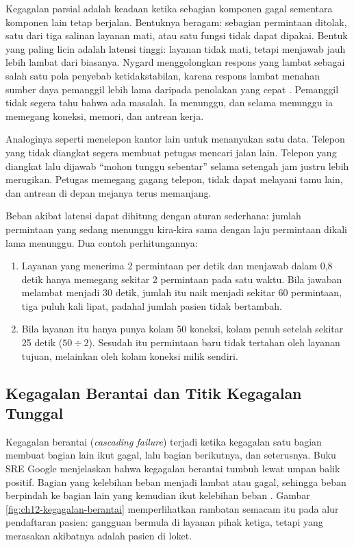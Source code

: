 Kegagalan parsial adalah keadaan ketika sebagian komponen gagal sementara komponen lain tetap
berjalan. Bentuknya beragam: sebagian permintaan ditolak, satu dari tiga salinan layanan mati, atau
satu fungsi tidak dapat dipakai. Bentuk yang paling licin adalah latensi tinggi: layanan tidak mati,
tetapi menjawab jauh lebih lambat dari biasanya. Nygard menggolongkan respons yang lambat sebagai
salah satu pola penyebab ketidakstabilan, karena respons lambat menahan sumber daya pemanggil lebih
lama daripada penolakan yang cepat \cite{c12-nygard2018}. Pemanggil tidak segera tahu bahwa ada
masalah. Ia menunggu, dan selama menunggu ia memegang koneksi, memori, dan antrean kerja.

Analoginya seperti menelepon kantor lain untuk menanyakan satu data. Telepon yang tidak diangkat
segera membuat petugas mencari jalan lain. Telepon yang diangkat lalu dijawab ``mohon tunggu
sebentar'' selama setengah jam justru lebih merugikan. Petugas memegang gagang telepon, tidak dapat
melayani tamu lain, dan antrean di depan mejanya terus memanjang.

Beban akibat latensi dapat dihitung dengan aturan sederhana: jumlah permintaan yang sedang menunggu
kira-kira sama dengan laju permintaan dikali lama menunggu. Dua contoh perhitungannya:
\begin{enumerate}
  \item Layanan yang menerima 2 permintaan per detik dan menjawab dalam 0,8 detik hanya memegang
        sekitar 2 permintaan pada satu waktu. Bila jawaban melambat menjadi 30 detik, jumlah itu
        naik menjadi sekitar 60 permintaan, tiga puluh kali lipat, padahal jumlah pasien tidak
        bertambah.
  \item Bila layanan itu hanya punya kolam 50 koneksi, kolam penuh setelah sekitar 25 detik
        ($50 \div 2$). Sesudah itu permintaan baru tidak tertahan oleh layanan tujuan, melainkan
        oleh kolam koneksi milik sendiri.
\end{enumerate}

\subsection{Kegagalan Berantai dan Titik Kegagalan Tunggal}

Kegagalan berantai (\textit{cascading failure}) terjadi ketika kegagalan satu bagian membuat bagian
lain ikut gagal, lalu bagian berikutnya, dan seterusnya. Buku SRE Google menjelaskan bahwa kegagalan
berantai tumbuh lewat umpan balik positif. Bagian yang kelebihan beban menjadi lambat atau gagal,
sehingga beban berpindah ke bagian lain yang kemudian ikut kelebihan beban \cite{beyer2016}. Gambar
\ref{fig:ch12-kegagalan-berantai} memperlihatkan rambatan semacam itu pada alur pendaftaran pasien:
gangguan bermula di layanan pihak ketiga, tetapi yang merasakan akibatnya adalah pasien di loket.

